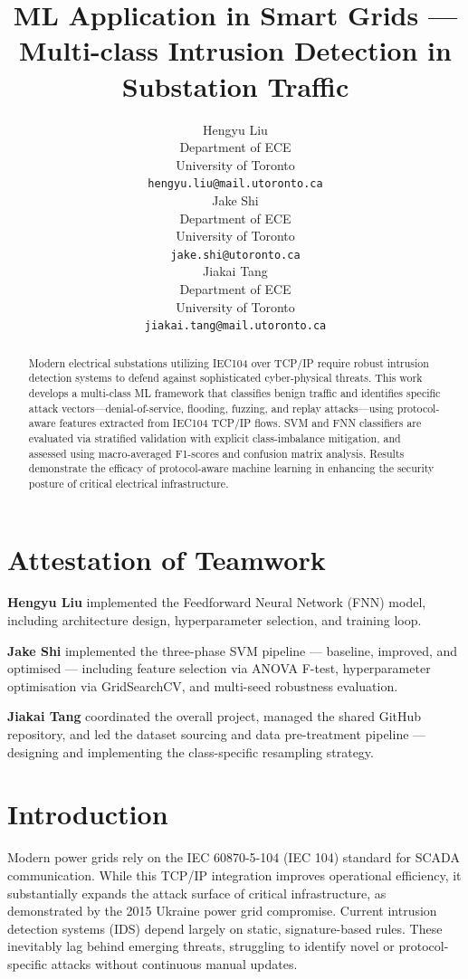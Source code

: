 \documentclass{article}
\title{ML Application in Smart Grids --- Multi-class Intrusion Detection in Substation Traffic}
\author{%
  Hengyu Liu\\
  Department of ECE\\
  University of Toronto\\
  \texttt{hengyu.liu@mail.utoronto.ca} \\
  \And
  Jake Shi\\
  Department of ECE\\
  University of Toronto\\
  \texttt{jake.shi@utoronto.ca} \\
  \And
  Jiakai Tang\\
  Department of ECE\\
  University of Toronto\\
  \texttt{jiakai.tang@mail.utoronto.ca} \\
}
\begin{document}
\maketitle


\begin{abstract}
Modern electrical substations utilizing IEC104 over TCP/IP require robust intrusion detection systems to defend against sophisticated cyber-physical threats. This work develops a multi-class ML framework that classifies benign traffic and identifies specific attack vectors---denial-of-service, flooding, fuzzing, and replay attacks---using protocol-aware features extracted from IEC104 TCP/IP flows. SVM and FNN classifiers are evaluated via stratified validation with explicit class-imbalance mitigation, and assessed using macro-averaged F1-scores and confusion matrix analysis. Results demonstrate the efficacy of protocol-aware machine learning in enhancing the security posture of critical electrical infrastructure.
\end{abstract}

\section*{Attestation of Teamwork}
\textbf{Hengyu Liu} implemented the Feedforward Neural Network (FNN) model, including architecture design, hyperparameter selection, and training loop.

\textbf{Jake Shi} implemented the three-phase SVM pipeline --- baseline, improved, and optimised --- including feature selection via ANOVA F-test, hyperparameter optimisation via GridSearchCV, and multi-seed robustness evaluation.

\textbf{Jiakai Tang} coordinated the overall project, managed the shared GitHub repository, and led the dataset sourcing and data pre-treatment pipeline --- designing and implementing the class-specific resampling strategy.


\section{Introduction}

Modern power grids rely on the IEC 60870-5-104 (IEC 104) standard for SCADA communication. While this TCP/IP integration improves operational efficiency, it substantially expands the attack surface of critical infrastructure, as demonstrated by the 2015 Ukraine power grid compromise. Current intrusion detection systems (IDS) depend largely on static, signature-based rules. These inevitably lag behind emerging threats, struggling to identify novel or protocol-specific attacks without continuous manual updates.
\end{document}
